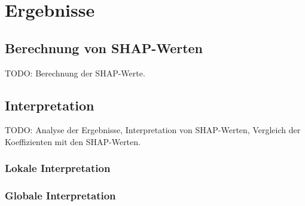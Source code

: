 \chapter{Ergebnisse}
\section{Berechnung von SHAP-Werten}

TODO: Berechnung der SHAP-Werte.

\section{Interpretation}

TODO: Analyse der Ergebnisse, Interpretation von SHAP-Werten, Vergleich der Koeffizienten mit den \acs{SHAP-Werten}.

\subsection{Lokale Interpretation}
\subsection{Globale Interpretation}